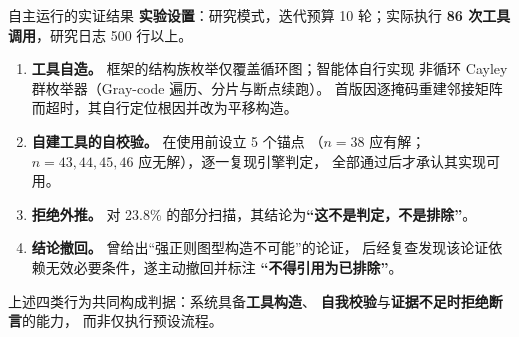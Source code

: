 \documentclass[aspectratio=169,11pt]{beamer}
\renewcommand{\emph}[1]{\textbf{#1}}   %
\newcommand{\key}[1]{\textbf{\color{accent}#1}}
\begin{document}
\begin{frame}{自主运行的实证结果}
  \textbf{实验设置}：研究模式，迭代预算 10 轮；实际执行
  \key{86 次工具调用}，研究日志 500 行以上。

  \vspace{0.5em}
  \begin{enumerate}
    \item \textbf{工具自造。} 框架的结构族枚举仅覆盖循环图；智能体自行实现
      非循环 Cayley 群枚举器（Gray-code 遍历、分片与断点续跑）。
      首版因逐掩码重建邻接矩阵而超时，其自行定位根因并改为平移构造。

    \item \textbf{自建工具的自校验。} 在使用前设立 5 个锚点
      （$n=38$ 应有解；$n=43,44,45,46$ 应无解），逐一复现引擎判定，
      全部通过后才承认其实现可用。

    \item \textbf{拒绝外推。} 对 23.8\% 的部分扫描，其结论为\emph{“这不是判定，不是排除”}。

    \item \textbf{结论撤回。} 曾给出“强正则图型构造不可能”的论证，
      后经复查发现该论证依赖无效必要条件，遂主动撤回并标注
      \emph{“不得引用为已排除”}。
  \end{enumerate}

  \vspace{0.4em}
  \begin{block}{}
    \small
    上述四类行为共同构成判据：系统具备\textbf{工具构造}、
    \textbf{自我校验}与\textbf{证据不足时拒绝断言}的能力，
    而非仅执行预设流程。
  \end{block}
\end{frame}
\end{document}
